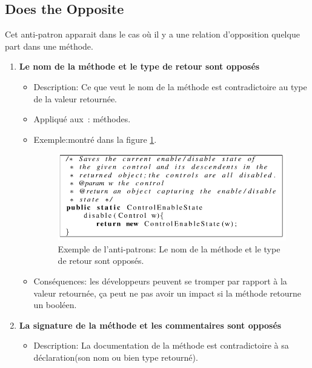 \subsection{Does the Opposite}
Cet anti-patron apparait dans le cas où il y a une relation d'opposition quelque part dans une méthode\cite{arnaoudova2013new}.
\begin{enumerate}
    

\item \textbf {Le nom de la méthode et le type de retour sont opposés}
\begin{itemize}
\item Description: Ce que veut le nom de la méthode est contradictoire au type de la valeur retournée.
\item Appliqué aux : méthodes.
\item Exemple:montré dans la figure \ref{fig:trois_un}.
\begin{figure}[H]
	\centering
\includegraphics[width=0.9\linewidth]{Others/Resources/trois_un.png}
	\caption{Exemple de l'anti-patrons: Le nom de la méthode et le type de retour sont opposés\cite{arnaoudova2013new}.}
		\label{fig:trois_un}
	\end{figure}
\item Conséquences: les développeurs peuvent se tromper par rapport à la valeur retournée, ça peut ne pas avoir un impact si la méthode retourne un booléen.
\end{itemize}

\item \textbf {La signature de la méthode et les commentaires sont opposés}
\begin{itemize}
\item Description: La documentation de la méthode est contradictoire à sa déclaration(son nom ou bien type retourné).


\end{itemize}
\end{enumerate}
